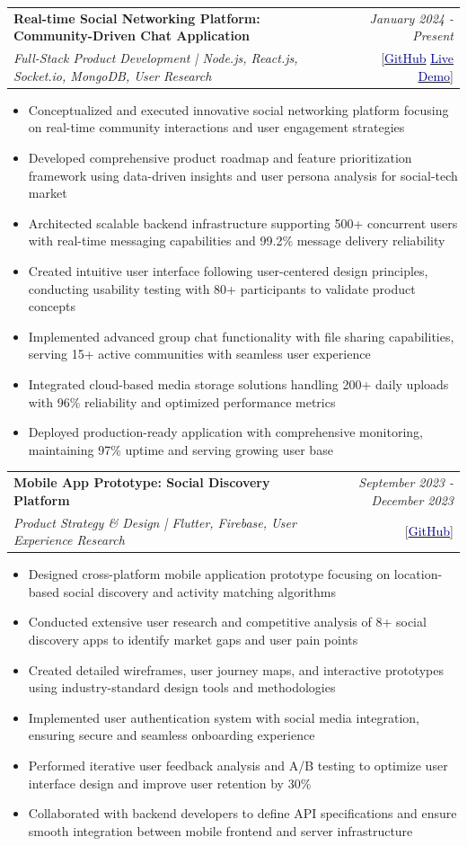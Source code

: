 \documentclass[a4paper,11pt]{article}
\makeatletter
\newcommand{\resumeProject}[4]{
\vspace{0.5mm}\item
    \begin{tabular*}{0.98\textwidth}[t]{l@{\extracolsep{\fill}}r}
        \textbf{#1} & \textit{\footnotesize{#3}} \\
        \footnotesize{\textit{#2}} & \footnotesize{#4}
    \end{tabular*}
    \vspace{-2.4mm}
}
\newcommand{\resumeItemListStart}{\begin{itemize}[leftmargin=*,labelsep=1mm,itemsep=0.5mm]}
\newcommand{\resumeItemListEnd}{\end{itemize}\vspace{-2mm}}
\makeatother
\begin{document}
\resumeProject
    {Real-time Social Networking Platform: Community-Driven Chat Application}
    {Full-Stack Product Development | Node.js, React.js, Socket.io, MongoDB, User Research}
    {January 2024 - Present}
    {{}[\href{https://github.com/123varunshhhhhh/RealtimeChatApp}{\textcolor{darkblue}{GitHub}} \href{https://realtimechat-frontend.vercel.app/}{\textcolor{darkblue}{Live Demo}}]}
\resumeItemListStart
\item Conceptualized and executed innovative social networking platform focusing on real-time community interactions and user engagement strategies
\item Developed comprehensive product roadmap and feature prioritization framework using data-driven insights and user persona analysis for social-tech market
\item Architected scalable backend infrastructure supporting 500+ concurrent users with real-time messaging capabilities and 99.2\% message delivery reliability
\item Created intuitive user interface following user-centered design principles, conducting usability testing with 80+ participants to validate product concepts
\item Implemented advanced group chat functionality with file sharing capabilities, serving 15+ active communities with seamless user experience
\item Integrated cloud-based media storage solutions handling 200+ daily uploads with 96\% reliability and optimized performance metrics
\item Deployed production-ready application with comprehensive monitoring, maintaining 97\% uptime and serving growing user base
\resumeItemListEnd

\resumeProject
    {Mobile App Prototype: Social Discovery Platform}
    {Product Strategy \& Design | Flutter, Firebase, User Experience Research}
    {September 2023 - December 2023}
    {{}[\href{https://github.com/123varunshhhhhh/social-discovery}{\textcolor{darkblue}{GitHub}}]}
\resumeItemListStart
\item Designed cross-platform mobile application prototype focusing on location-based social discovery and activity matching algorithms
\item Conducted extensive user research and competitive analysis of 8+ social discovery apps to identify market gaps and user pain points
\item Created detailed wireframes, user journey maps, and interactive prototypes using industry-standard design tools and methodologies
\item Implemented user authentication system with social media integration, ensuring secure and seamless onboarding experience
\item Performed iterative user feedback analysis and A/B testing to optimize user interface design and improve user retention by 30\%
\item Collaborated with backend developers to define API specifications and ensure smooth integration between mobile frontend and server infrastructure
\resumeItemListEnd
\end{document}
